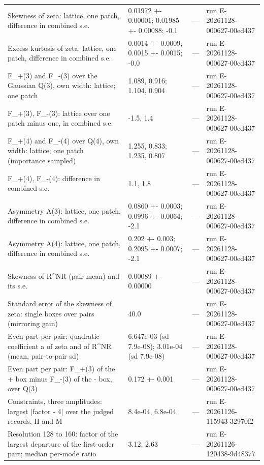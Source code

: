 \begin{table}
\begin{tabular}{p{}p{}p{}p{}}
Skewness of zeta: lattice, one patch, difference in combined s.e. & 0.01972 +- 0.00001; 0.01985 +- 0.00088; -0.1 & --- & run E-20261128-000627-00ed437 \\
Excess kurtosis of zeta: lattice, one patch, difference in combined s.e. & 0.0014 +- 0.0009; 0.0015 +- 0.0015; -0.0 & --- & run E-20261128-000627-00ed437 \\
F\_+(3) and F\_-(3) over the Gaussian Q(3), own width: lattice; one patch & 1.089, 0.916; 1.104, 0.904 & --- & run E-20261128-000627-00ed437 \\
F\_+(3), F\_-(3): lattice over one patch minus one, in combined s.e. & -1.5, 1.4 & --- & run E-20261128-000627-00ed437 \\
F\_+(4) and F\_-(4) over Q(4), own width: lattice; one patch (importance sampled) & 1.255, 0.833; 1.235, 0.807 & --- & run E-20261128-000627-00ed437 \\
F\_+(4), F\_-(4): difference in combined s.e. & 1.1, 1.8 & --- & run E-20261128-000627-00ed437 \\
Asymmetry A(3): lattice, one patch, difference in combined s.e. & 0.0860 +- 0.0003; 0.0996 +- 0.0064; -2.1 & --- & run E-20261128-000627-00ed437 \\
Asymmetry A(4): lattice, one patch, difference in combined s.e. & 0.202 +- 0.003; 0.2095 +- 0.0007; -2.1 & --- & run E-20261128-000627-00ed437 \\
Skewness of R\^{}NR (pair mean) and its s.e. & 0.00089 +- 0.00000 & --- & run E-20261128-000627-00ed437 \\
Standard error of the skewness of zeta: single boxes over pairs (mirroring gain) & 40.0 & --- & run E-20261128-000627-00ed437 \\
Even part per pair: quadratic coefficient a of zeta and of R\^{}NR (mean, pair-to-pair sd) & 6.647e-03 (sd 7.9e-08); 3.01e-04 (sd 7.9e-08) & --- & run E-20261128-000627-00ed437 \\
Even part per pair: F\_+(3) of the + box minus F\_-(3) of the - box, over Q(3) & 0.172 +- 0.001 & --- & run E-20261128-000627-00ed437 \\
Constraints, three amplitudes: largest $|$factor - 4$|$ over the judged records, H and M & 8.4e-04, 6.8e-04 & --- & run E-20261126-115943-32970f2 \\
Resolution 128 to 160: factor of the largest departure of the first-order part; median per-mode ratio & 3.12; 2.63 & --- & run E-20261126-120438-9d48377 \\
\bottomrule
\end{tabular}
\end{table}
